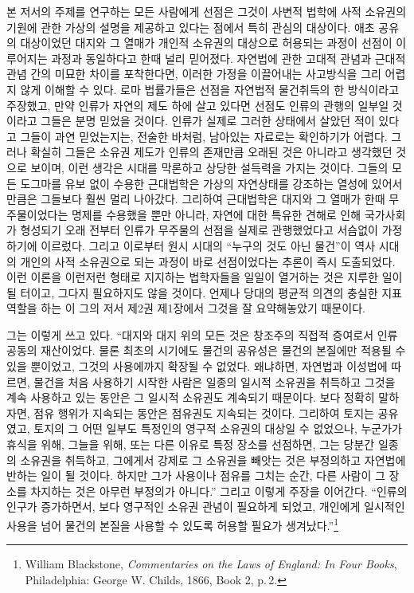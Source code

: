 본 저서의 주제를 연구하는 모든 사람에게
선점은
그것이
사변적 법학에
사적 소유권의 기원에 관한 가상의 설명을
제공하고 있다는 점에서
특히 관심의 대상이다.
애초 공유의 대상이었던 대지와 그 열매가
개인적 소유권의 대상으로 허용되는 과정이
선점이 이루어지는 과정과 동일하다고 한때 널리 믿어졌다.
자연법에 관한 고대적 관념과 근대적 관념 간의 미묘한 차이를 포착한다면,
이러한 가정을 이끌어내는 사고방식을
그리 어렵지 않게 이해할 수 있다.
로마 법률가들은 선점을 자연법적 물건취득의 한 방식이라고 주장했고,
만약 인류가 자연의 제도 하에 살고 있다면
선점도 인류의 관행의 일부일 것이라고 그들은 분명 믿었을 것이다.
인류가 실제로 그러한 상태에서 살았던 적이 있다고 그들이 과연 믿었는지는,
전술한 바처럼, 남아있는 자료로는 확인하기가 어렵다.
그러나 확실히 그들은
소유권 제도가 인류의 존재만큼 오래된 것은 아니라고 생각했던 것으로 보이며,
이런 생각은 시대를 막론하고 상당한 설득력을 가지는 것이다.
그들의 모든 도그마를 유보 없이 수용한 근대법학은
가상의 자연상태를 강조하는 열성에 있어서만큼은
그들보다 훨씬 멀리 나아갔다.
그리하여 근대법학은
대지와 그 열매가 한때 무주물이었다는 명제를
수용했을 뿐만 아니라,
자연에 대한 특유한 견해로 인해
국가사회가 형성되기 오래 전부터
인류가 무주물의 선점을 실제로 관행했었다고
서슴없이
가정하기에 이르렀다.
그리고 이로부터
원시 시대의 ``누구의 것도 아닌 물건''이
역사 시대의 개인의 사적 소유권으로 되는 과정이
바로 선점이었다는 추론이
즉시
도출되었다.
이런 이론을
이런저런 형태로
지지하는 법학자들을 일일이 열거하는 것은
지루한 일이 될 터이고,
그다지 필요하지도 않을 것이다.
언제나
당대의 평균적 의견의 충실한 지표 역할을 하는
이 그의 저서 제2권 제1장에서
그것을 잘 요약해놓았기 때문이다.

그는 이렇게 쓰고 있다.
``대지와 대지 위의 모든 것은 창조주의 직접적 증여로서
인류 공동의 재산이었다.
물론
최초의 시기에도
물건의 공유성은
물건의 본질에만 적용될 수 있을 뿐이었고,
그것의 사용에까지 확장될 수 없었다.
왜냐하면, 자연법과 이성법에 따르면,
물건을 처음 사용하기 시작한 사람은
일종의 일시적 소유권을 취득하고
그것을 계속 사용하고 있는 동안은 그 일시적 소유권도 계속되기 때문이다.
보다 정확히 말하자면,
점유 행위가 지속되는 동안은 점유권도 지속되는 것이다.
그리하여 토지는 공유였고,
토지의 그 어떤 일부도 특정인의 영구적 소유권의 대상일 수 없었으나,
누군가가
휴식을 위해, 그늘을 위해, 또는 다른 이유로
특정 장소를 선점하면,
그는 당분간 일종의 소유권을 취득하고,
그에게서 강제로 그 소유권을 빼앗는 것은 부정의하고
자연법에 반하는 일이 될 것이다. 하지만
그가 사용이나 점유를 그치는 순간,
다른 사람이 그 장소를 차지하는 것은 아무런 부정의가 아니다.''
그리고 이렇게 주장을 이어간다.
``인류의 인구가 증가하면서,
보다 영구적인 소유권 관념이 필요하게 되었고,
개인에게
일시적인 사용을 넘어
물건의 본질을 사용할 수 있도록
허용할 필요가 생겨났다.''\footnote{%
  \latinmarks
  William Blackstone,
  \textit{Commentaries on the Laws of England: In Four Books},
  Philadelphia: George W. Childs, 1866,
  Book 2, p.\,2. }

